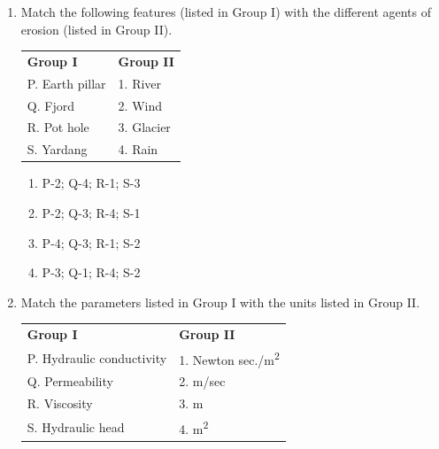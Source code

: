\documentclass[journal,12pt,onecolumn]{IEEEtran}
\begin{document}
\begin{enumerate}
\begin{enumerate}
\hfill{}

\begin{multicols}{4}
\begin{enumerate}
\item Shrinkage Limit
\item Plastic Limit
\item Liquid Limit
\item Activity
\end{enumerate}
\end{multicols}




\item Match the following features (listed in Group I) with the different agents of erosion (listed in Group II).

\begin{tabular}{p{} p{}}
\textbf{Group I} & \textbf{Group II} \\
P. Earth pillar & 1. River \\
Q. Fjord & 2. Wind \\
R. Pot hole & 3. Glacier \\
S. Yardang & 4. Rain \\
\end{tabular}

\hfill{}

\begin{multicols}{2}
\begin{enumerate}
\item P-2; Q-4; R-1; S-3
\item P-2; Q-3; R-4; S-1
\item P-4; Q-3; R-1; S-2
\item P-3; Q-1; R-4; S-2
\end{enumerate}
\end{multicols}

\item Match the parameters listed in Group I with the units listed in Group II.

\begin{tabular}{p{} p{}}
\textbf{Group I} & \textbf{Group II} \\
P. Hydraulic conductivity & 1. Newton sec./m\textsuperscript{2} \\
Q. Permeability & 2. m/sec \\
R. Viscosity & 3. m \\
S. Hydraulic head & 4. m\textsuperscript{2} \\
\end{tabular}


\end{enumerate}
\end{enumerate}
\end{document}
